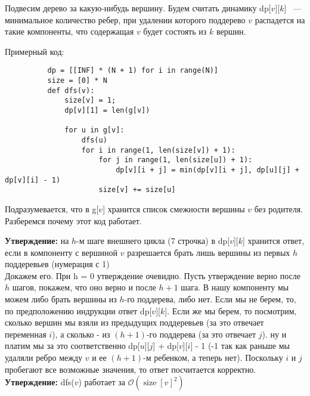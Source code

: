 \documentclass[a4paper,12pt]{article}
\begin{document}
      Подвесим дерево за какую-нибудь вершину. Будем считать динамику 
      dp[$v$][$k$] ~--- минимальное количество ребер, при удалении которого
      поддерево $v$ распадется на такие компоненты, что содержащая $v$
      будет состоять из $k$ вершин.
      
      Примерный код:
      \begin{lstlisting}
          dp = [[INF] * (N + 1) for i in range(N)]
          size = [0] * N
          def dfs(v):
              size[v] = 1;
              dp[v][1] = len(g[v])
    
              for u in g[v]:
                  dfs(u)
                  for i in range(1, len(size[v]) + 1):
                      for j in range(1, len(size[u]) + 1):
                          dp[v][i + j] = min(dp[v][i + j], dp[u][j] + dp[v][i] - 1) 
                      size[v] += size[u]       
      \end{lstlisting}
      
      Подразумевается, что в g[$v$] хранится список смежности вершины
      $v$ без родителя.\\

      Разберемся почему этот код работает.

      \textbf{Утверждение:} на $h$-м шаге внешнего цикла (7 строчка) 
      в dp[$v$][$k$] хранится ответ, если в компоненту с вершиной $v$
      разрешается брать лишь вершины из первых $h$ поддеревьев (нумерация с 1)
      \\
      
      Докажем его. При h = 0 утверждение очевидно. Пусть утверждение верно 
      после $h$ шагов, покажем, что оно верно и после $h + 1$ шага. В нашу 
      компоненту мы можем либо брать вершины из $h$-го поддерева, либо нет. 
      Если мы не берем, то, по предположению индрукции ответ dp[$v$][$k$]. 
      Если же мы берем, то посмотрим, сколько вершин мы взяли из предыдущих 
      поддеревьев (за это отвечает переменная $i$), а сколько - из 
      $(h + 1)$-го поддерева (за это отвечает $j$). ну и платим мы за это 
      соответственно dp[$u$][$j$] + dp[$v$][$i$] - 1 (-1 так как раньше мы 
      удаляли ребро между $v$ и ее $(h + 1)$-м ребенком, а теперь нет). 
      Поскольку $i$ и $j$ пробегают все возможные значения, то ответ 
      посчитается корректно. 
      \\
      
      \textbf{Утверждение:} dfs($v$) работает за 
      $\mathcal{O}(\operatorname{size}[v]^2)$ 
\end{document}
